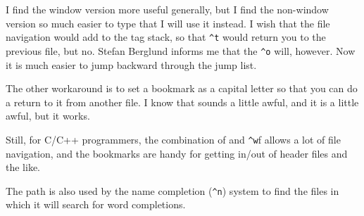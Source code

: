 \documentclass[a4paper, 12pt]{article}
\begin{document}
      I find the window version more useful generally, but I find the non-window version so much easier to type that I will use it instead. I wish that the file navigation would add to the tag stack, so that \texttt{\^{}t} would return you to the previous file, but no. Stefan Berglund informs me that the \texttt{\^{}o} will, however. Now it is much easier to jump backward through the jump list.

      The other workaround is to set a bookmark as a capital letter so that you can do a return to it from another file. I know that sounds a little awful, and it is a little awful, but it works.

      Still, for C/C++ programmers, the combination of \K and \texttt{\^{}w}f allows a lot of file navigation, and the bookmarks are handy for getting in/out of header files and the like.

      The path is also used by the name completion (\texttt{\^{}n}) system to find the files in which it will search for word completions.
\end{document}
